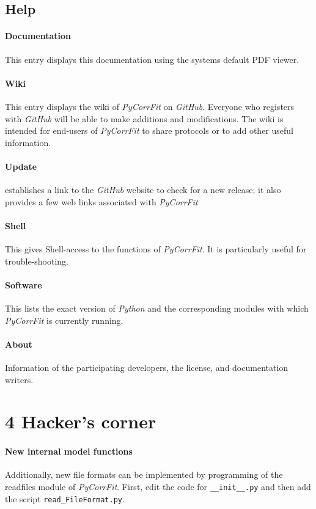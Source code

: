 \subsection{Help}
\paragraph*{Documentation}
This entry displays this documentation using the systems default PDF viewer.
\paragraph*{Wiki}
This entry displays the wiki of \textit{PyCorrFit} on \textit{GitHub}. Everyone who registers with \textit{GitHub} will be able to make additions and modifications. The wiki is intended for end-users of \textit{PyCorrFit} to share protocols or to add other useful information.
\paragraph*{Update}
establishes a link to the \textit{GitHub} website to check for a new release; it also provides a few web links associated with \textit{PyCorrFit}
\paragraph*{Shell}
This gives Shell-access to the functions of \textit{PyCorrFit}. It is particularly useful for trouble-shooting.
\paragraph*{Software}
This lists the exact version of \textit{Python} and the corresponding modules with which \textit{PyCorrFit} is currently running.
\paragraph*{About}
Information of the participating developers, the license, and documentation writers.


\section{4 Hacker's corner}
\label{sec:hacke}
\paragraph*{New internal model functions}
Additionally, new file formats can be implemented by programming of the readfiles module of \textit{PyCorrFit}. First, edit the code for \texttt{\_\_init\_\_.py} and then add the script \texttt{read\_FileFormat.py}.

